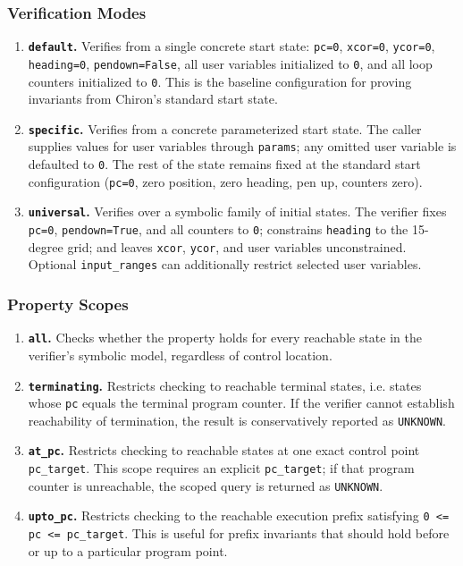 \subsubsection*{Verification Modes}
\begin{enumerate}[leftmargin=1.5em, itemsep=4pt, topsep=4pt]
    \item \textbf{\texttt{default}.} Verifies from a single concrete start state: \texttt{pc=0}, \texttt{xcor=0}, \texttt{ycor=0}, \texttt{heading=0}, \texttt{pendown=False}, all user variables initialized to \texttt{0}, and all loop counters initialized to \texttt{0}. This is the baseline configuration for proving invariants from Chiron's standard start state.
    \item \textbf{\texttt{specific}.} Verifies from a concrete parameterized start state. The caller supplies values for user variables through \texttt{params}; any omitted user variable is defaulted to \texttt{0}. The rest of the state remains fixed at the standard start configuration (\texttt{pc=0}, zero position, zero heading, pen up, counters zero).
    \item \textbf{\texttt{universal}.} Verifies over a symbolic family of initial states. The verifier fixes \texttt{pc=0}, \texttt{pendown=True}, and all counters to \texttt{0}; constrains \texttt{heading} to the 15-degree grid; and leaves \texttt{xcor}, \texttt{ycor}, and user variables unconstrained. Optional \texttt{input\_ranges} can additionally restrict selected user variables.
\end{enumerate}

\subsubsection*{Property Scopes}
\begin{enumerate}[leftmargin=1.5em, itemsep=4pt, topsep=4pt]
    \item \textbf{\texttt{all}.} Checks whether the property holds for every reachable state in the verifier's symbolic model, regardless of control location.
    \item \textbf{\texttt{terminating}.} Restricts checking to reachable terminal states, i.e. states whose \texttt{pc} equals the terminal program counter. If the verifier cannot establish reachability of termination, the result is conservatively reported as \texttt{UNKNOWN}.
    \item \textbf{\texttt{at\_pc}.} Restricts checking to reachable states at one exact control point \texttt{pc\_target}. This scope requires an explicit \texttt{pc\_target}; if that program counter is unreachable, the scoped query is returned as \texttt{UNKNOWN}.
    \item \textbf{\texttt{upto\_pc}.} Restricts checking to the reachable execution prefix satisfying \texttt{0 <= pc <= pc\_target}. This is useful for prefix invariants that should hold before or up to a particular program point.
\end{enumerate}

